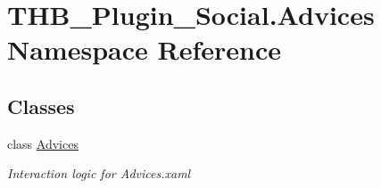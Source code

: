 \hypertarget{namespace_t_h_b___plugin___social_1_1_advices}{}\section{T\+H\+B\+\_\+\+Plugin\+\_\+\+Social.\+Advices Namespace Reference}
\label{namespace_t_h_b___plugin___social_1_1_advices}
\subsection*{Classes}
\begin{DoxyCompactItemize}
\item 
class \mbox{\hyperlink{class_t_h_b___plugin___social_1_1_advices_1_1_advices}{Advices}}
\begin{DoxyCompactList}\small\item\em Interaction logic for Advices.\+xaml \end{DoxyCompactList}\end{DoxyCompactItemize}
